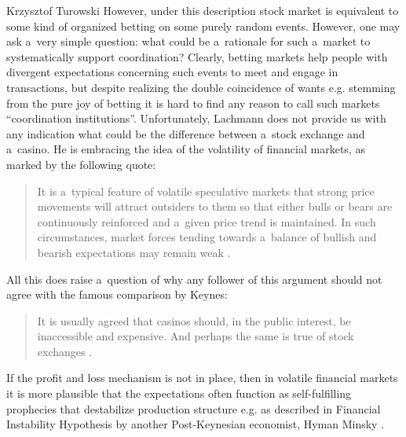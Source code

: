 \begin{artengenv}{Krzysztof Turowski}
However, under this description stock market is equivalent to some kind of organized betting on some purely random events.
However, one may ask a~very simple question: what could be a~rationale for such a~market to systematically support coordination?
Clearly, betting markets help people with divergent expectations concerning such events to meet and engage in transactions, but despite realizing the double coincidence of wants e.g. stemming from the pure joy of betting it is hard to find any reason to call such markets ``coordination institutions''.
Unfortunately, Lachmann does not provide us with any indication what could be the difference between a~stock exchange and a~casino.
He is embracing the idea of the volatility of financial markets, as marked by the following quote:
\begin{quote}
It is a~typical feature of volatile speculative markets that strong price movements will attract outsiders to them so that either bulls or bears are continuously reinforced and a~given price trend is maintained. In such circumstances, market forces tending towards a~balance of bullish and bearish expectations may remain weak \parencite[259]{lachmann-monetary}.
\end{quote}
All this does raise a~question of why any follower of this argument should not agree with the famous comparison by Keynes:
\begin{quote}
It is usually agreed that casinos should, in the public interest, be inaccessible and expensive. And perhaps the same is true of stock exchanges \parencite[159]{keynes-gt}.
\end{quote}
If the profit and loss mechanism is not in place, then in volatile financial markets it is more plausible that the expectations often function as self-fulfilling prophecies that destabilize production structure e.g. as described in Financial Instability Hypothesis by another Post-Keynesian economist, Hyman Minsky \parencite*{minsky}.


\end{artengenv}
